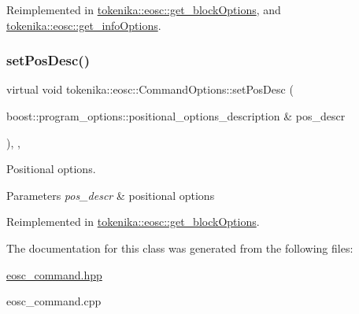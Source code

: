 Reimplemented in \hyperlink{classtokenika_1_1eosc_1_1get__block_options_acb69f3c1fb4dc9b86d070111602a69e0}{tokenika\+::eosc\+::get\+\_\+block\+Options}, and \hyperlink{classtokenika_1_1eosc_1_1get__info_options_a8731c87cc2429a975e87ce36dd7fcf68}{tokenika\+::eosc\+::get\+\_\+info\+Options}.

\mbox{\label{classtokenika_1_1eosc_1_1_command_options_ae2e98c683ae1eb3e5af1e81e60020447}} 
\subsubsection{\texorpdfstring{set\+Pos\+Desc()}{setPosDesc()}}
{\footnotesize\ttfamily virtual void tokenika\+::eosc\+::\+Command\+Options\+::set\+Pos\+Desc (\begin{DoxyParamCaption}\item[{boost\+::program\+\_\+options\+::positional\+\_\+options\+\_\+description \&}]{pos\+\_\+descr }\end{DoxyParamCaption})\hspace{0.3cm}{\ttfamily [inline]}, {\ttfamily [protected]}, {\ttfamily [virtual]}}



Positional options. 


\begin{DoxyParams}{Parameters}
{\em pos\+\_\+descr} & positional options \\
\hline
\end{DoxyParams}


Reimplemented in \hyperlink{classtokenika_1_1eosc_1_1get__block_options_ae4700d2d07381825120bed34148b76f0}{tokenika\+::eosc\+::get\+\_\+block\+Options}.



The documentation for this class was generated from the following files\+:\begin{DoxyCompactItemize}
\item 
\hyperlink{eosc__command_8hpp}{eosc\+\_\+command.\+hpp}\item 
eosc\+\_\+command.\+cpp\end{DoxyCompactItemize}
